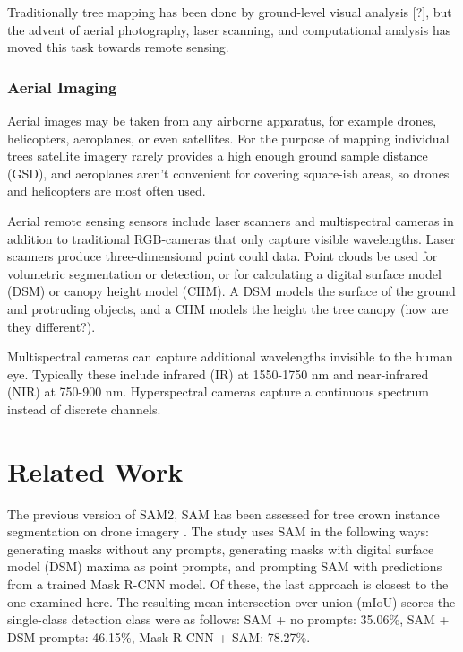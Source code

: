 \documentclass[english, 12pt, a4paper, sci, utf8, a-2b, online]{aaltothesis}
\begin{document}
\begin{enumerate}
\begin{end}
Traditionally tree mapping has been done by ground-level visual analysis [?], but the advent of aerial photography, laser scanning, and computational analysis has moved this task towards remote sensing.

\subsubsection{Aerial Imaging}

Aerial images may be taken from any airborne apparatus, for example drones, helicopters, aeroplanes, or even satellites. For the purpose of mapping individual trees satellite imagery rarely provides a high enough ground sample distance (GSD), and aeroplanes aren't convenient for covering square-ish areas, so drones and helicopters are most often used.
\newline
{}
\newline

Aerial remote sensing sensors include laser scanners and multispectral cameras in addition to traditional RGB-cameras that only capture visible wavelengths. Laser scanners produce three-dimensional point could data. Point clouds be used for volumetric segmentation or detection, or for calculating a digital surface model (DSM) or canopy height model (CHM). A DSM models the surface of the ground and protruding objects, and a CHM models the height the tree canopy (how are they different?).
\newline
{}
\newline

Multispectral cameras can capture additional wavelengths invisible to the human eye. Typically these include infrared (IR) at 1550-1750 nm and near-infrared (NIR) at 750-900 nm. Hyperspectral cameras capture a continuous spectrum instead of discrete channels.
\newline
{}
\newline

\newpage
\section{Related Work}

The previous version of SAM2, SAM has been assessed for tree crown instance segmentation on drone imagery \cite{sam-treecrown}. The study uses SAM in the following ways: generating masks without any prompts, generating masks with digital surface model (DSM) maxima as point prompts, and prompting SAM with predictions from a trained Mask R-CNN model. Of these, the last approach is closest to the one examined here. The resulting mean intersection over union (mIoU) scores the single-class detection class were as follows: SAM + no prompts: 35.06\%, SAM + DSM prompts: 46.15\%, Mask R-CNN + SAM: 78.27\%.


\end{end}
\end{enumerate}
\end{document}
